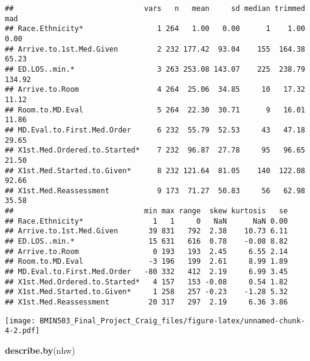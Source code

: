 \documentclass[]{article}
\newenvironment{Shaded}{\begin{snugshade}}{\end{snugshade}}
\newcommand{\KeywordTok}[1]{\textcolor[rgb]{0.13,0.29,0.53}{\textbf{#1}}}
\newcommand{\OperatorTok}[1]{\textcolor[rgb]{0.81,0.36,0.00}{\textbf{#1}}}
\newcommand{\NormalTok}[1]{#1}
\begin{document}
\begin{verbatim}
##                              vars   n   mean     sd median trimmed    mad
## Race.Ethnicity*                 1 264   1.00   0.00      1    1.00   0.00
## Arrive.to.1st.Med.Given         2 232 177.42  93.04    155  164.38  65.23
## ED.LOS..min.*                   3 263 253.08 143.07    225  238.79 134.92
## Arrive.to.Room                  4 264  25.06  34.85     10   17.32  11.12
## Room.to.MD.Eval                 5 264  22.30  30.71      9   16.01  11.86
## MD.Eval.to.First.Med.Order      6 232  55.79  52.53     43   47.18  29.65
## X1st.Med.Ordered.to.Started*    7 232  96.87  27.78     95   96.65  21.50
## X1st.Med.Started.to.Given*      8 232 121.64  81.05    140  122.08  92.66
## X1st.Med.Reassessment           9 173  71.27  50.83     56   62.98  35.58
##                              min max range  skew kurtosis   se
## Race.Ethnicity*                1   1     0   NaN      NaN 0.00
## Arrive.to.1st.Med.Given       39 831   792  2.38    10.73 6.11
## ED.LOS..min.*                 15 631   616  0.78    -0.08 8.82
## Arrive.to.Room                 0 193   193  2.45     6.55 2.14
## Room.to.MD.Eval               -3 196   199  2.61     8.99 1.89
## MD.Eval.to.First.Med.Order   -80 332   412  2.19     6.99 3.45
## X1st.Med.Ordered.to.Started*   4 157   153 -0.08     0.54 1.82
## X1st.Med.Started.to.Given*     1 258   257 -0.23    -1.28 5.32
## X1st.Med.Reassessment         20 317   297  2.19     6.36 3.86
\end{verbatim}

\begin{Shaded}
\end{Shaded}

\texttt{[image: BMIN503\_Final\_Project\_Craig\_files/figure-latex/unnamed-chunk-4-2.pdf]}

\begin{Shaded}
\begin{Highlighting}[]
\KeywordTok{describe.by}\NormalTok{(nhw)}
\end{Highlighting}
\end{Shaded}
\end{document}
